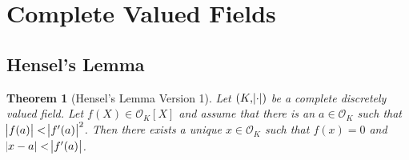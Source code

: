 \documentclass[11pt]{article}
\theoremstyle{definition}
\theoremstyle{plain}
\newtheorem{theorem}[definition]{Theorem}
\theoremstyle{remark}
\newcommand{\cO}{\mathcal{O}}
\begin{document}
\section{Complete Valued Fields}

\subsection{Hensel's Lemma}

\begin{theorem}[Hensel's Lemma Version 1]\label{thm:4_1}
    Let $(K, \abs{\cdot})$ be a complete discretely valued field. Let $f(X) \in \cO_K[X]$ and assume that there is an $a \in \cO_K$ such that $\abs{f(a)} < \abs{f'(a)}^2$. Then there exists a unique $x \in \cO_K$ such that $f(x) = 0$ and $\abs{x - a} < \abs{f'(a)}$.
\end{theorem}
\end{document}
